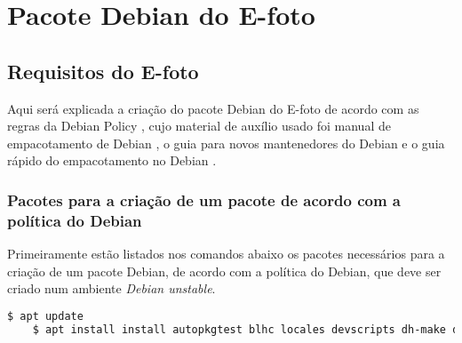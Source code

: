 \chapter{Pacote Debian do E-foto}
\section{Requisitos do E-foto}

Aqui será explicada a criação do pacote Debian do E-foto de acordo com as regras da Debian Policy \cite{bib:Ian}, cujo material de auxílio usado foi manual de empacotamento de Debian \cite{bib:Lucas}, o guia para novos mantenedores do Debian \cite{bib:Josip} e o guia rápido do empacotamento no Debian \cite{bib:Filho2020}.  

\subsection{Pacotes para a criação de um pacote de acordo com a política do Debian}

Primeiramente estão listados nos comandos abaixo os pacotes necessários para a criação de um pacote Debian, de acordo com a política do Debian, que deve ser criado num ambiente \textit{Debian unstable}. %

\begin{lstlisting}[language=bash]
	$ apt update
	$ apt install install autopkgtest blhc locales devscripts dh-make dput-ng git-buildpackage mc quilt spell tardiff tree
\end{lstlisting}

